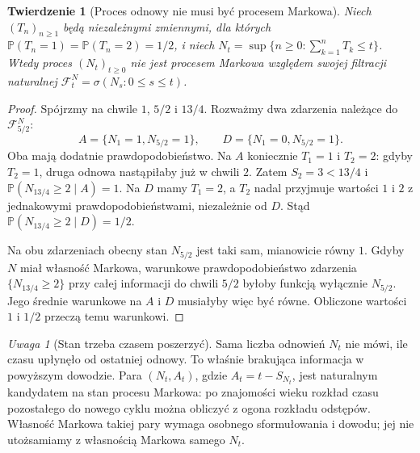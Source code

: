 \documentclass[11pt,a4paper,oneside]{report}
\numberwithin{equation}{chapter}
\theoremstyle{plain}
\newtheorem{twierdzenie}{Twierdzenie}[chapter]
\theoremstyle{definition}
\theoremstyle{remark}
\newtheorem{uwaga}{Uwaga}[chapter]
\newcommand{\Prob}{\mathbb{P}}
\begin{document}
\begin{twierdzenie}[Proces odnowy nie musi być procesem Markowa]
Niech $(T_n)_{n\ge1}$ będą niezależnymi zmiennymi, dla których
$\Prob(T_n=1)=\Prob(T_n=2)=1/2$, i niech
$N_t=\sup\{n\ge0:\sum_{k=1}^nT_k\le t\}$.
Wtedy proces $(N_t)_{t\ge0}$ \emph{nie jest} procesem Markowa
względem swojej filtracji naturalnej
$\mathcal F_t^N=\sigma(N_s:0\le s\le t)$.
\end{twierdzenie}
\begin{proof}
Spójrzmy na chwile $1$, $5/2$ i $13/4$.
Rozważmy dwa zdarzenia należące do $\mathcal F_{5/2}^N$:
\[
A=\{N_1=1,N_{5/2}=1\},\qquad
D=\{N_1=0,N_{5/2}=1\}.
\]
Oba mają dodatnie prawdopodobieństwo.
Na $A$ koniecznie $T_1=1$ i $T_2=2$: gdyby
$T_2=1$, druga odnowa nastąpiłaby już w chwili $2$.
Zatem $S_2=3<13/4$ i
$\Prob(N_{13/4}\ge2\mid A)=1$.
Na $D$ mamy $T_1=2$, a $T_2$ nadal przyjmuje wartości
$1$ i $2$ z jednakowymi prawdopodobieństwami,
niezależnie od $D$. Stąd
$\Prob(N_{13/4}\ge2\mid D)=1/2$.

Na obu zdarzeniach obecny stan $N_{5/2}$ jest taki sam,
mianowicie równy $1$. Gdyby $N$ miał własność Markowa,
warunkowe prawdopodobieństwo zdarzenia
$\{N_{13/4}\ge2\}$ przy całej informacji do chwili $5/2$
byłoby funkcją wyłącznie $N_{5/2}$. Jego średnie
warunkowe na $A$ i $D$ musiałyby więc być równe.
Obliczone wartości $1$ i $1/2$ przeczą temu warunkowi.
\end{proof}

\begin{uwaga}[Stan trzeba czasem poszerzyć]
Sama liczba odnowień $N_t$ nie mówi, ile czasu upłynęło
od ostatniej odnowy. To właśnie brakująca informacja w
powyższym dowodzie. Para $(N_t,A_t)$, gdzie
$A_t=t-S_{N_t}$, jest naturalnym kandydatem na stan
procesu Markowa: po znajomości wieku rozkład czasu
pozostałego do nowego cyklu można obliczyć z ogona
rozkładu odstępów. Własność Markowa takiej pary
wymaga osobnego sformułowania i dowodu; jej nie
utożsamiamy z własnością Markowa samego $N_t$.
\end{uwaga}
\end{document}

